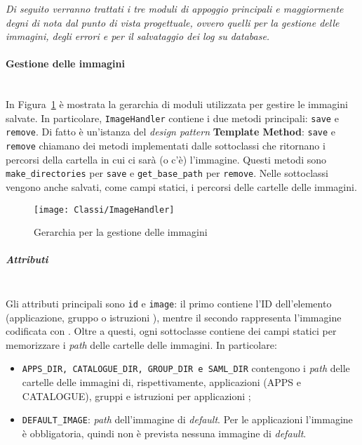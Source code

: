 \begin{center}
\textit{Di seguito verranno trattati i tre moduli di appoggio principali e maggiormente degni di nota dal punto di vista progettuale, ovvero quelli per la gestione delle immagini, degli errori e per il salvataggio dei log su \textit{database}.}
\end{center}
\paragraph{Gestione delle immagini} \mbox{} \\
In Figura~\ref{fig:ImageHandler} è mostrata la gerarchia di moduli utilizzata per gestire le immagini salvate. In particolare, \texttt{ImageHandler} contiene i due metodi principali: \texttt{save} e \texttt{remove}. Di fatto è un'istanza del \textit{design pattern} \textbf{Template Method}: \texttt{save} e \texttt{remove} chiamano dei metodi implementati dalle sottoclassi che ritornano i percorsi della cartella in cui ci sarà (o c'è) l’immagine. Questi metodi sono \texttt{make\_directories} per \texttt{save} e \texttt{get\_base\_path} per \texttt{remove}. Nelle sottoclassi vengono anche salvati, come campi statici, i percorsi delle cartelle delle immagini. 
\begin{figure}[h]
  \begin{center}
    \texttt{[image: Classi/ImageHandler]}
  \caption[Gerarchia per la gestione delle immagini]{Gerarchia per la gestione delle immagini}
  \label{fig:ImageHandler}
  \end{center} 
\end{figure}

\subparagraph{Attributi} \mbox{} \\
Gli attributi principali sono \texttt{id} e \texttt{image}: il primo contiene l'ID dell'elemento (applicazione, gruppo o istruzioni ), mentre il secondo rappresenta l'immagine codificata con . Oltre a questi, ogni sottoclasse contiene dei campi statici per memorizzare i \textit{path} delle cartelle delle immagini. In particolare:
\begin{itemize}
\item \texttt{APPS\_DIR, CATALOGUE\_DIR, GROUP\_DIR e SAML\_DIR} contengono i \textit{path} delle cartelle delle immagini di, rispettivamente, applicazioni (APPS e CATALOGUE), gruppi e istruzioni per applicazioni ;
\item \texttt{DEFAULT\_IMAGE}: \textit{path} dell'immagine di \textit{default}. Per le applicazioni l'immagine è obbligatoria, quindi non è prevista nessuna immagine di \textit{default}.
\end{itemize}


